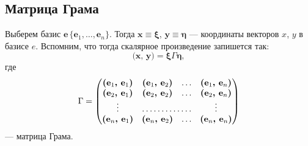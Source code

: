 \subsection{Матрица Грама}
Выберем базис $\textbf{e}\, \{\textbf{e$_1$},\dots,\textbf{e$_n$}\}$. Тогда $\textbf{x}\equiv \bm\xi$, $\textbf{y}\equiv \bm\eta$ --- координаты векторов $ x $, $ y $ в базисе $ e $. Вспомним, что тогда скалярное произведение запишется так:
$$
\textbf{(x, y)} = \bm\xi \Gamma \bm\eta,
$$
где 
$$
\Gamma = 
\begin{pmatrix}
\textbf{(e$_1$, e$_1$)} & \textbf{(e$_1$, e$_2$)} & \hdots & \textbf{(e$_1$, e$_n$)}\\
\textbf{(e$_2$, e$_1$)} & \textbf{(e$_2$, e$_2$)} & \hdots & \textbf{(e$_2$, e$_n$)}\\
\vdots & \hdotsfor{2} & \vdots\\
\textbf{(e$_n$, e$_1$)} & \textbf{(e$_n$, e$_2$)} & \hdots & \textbf{(e$_n$, e$_n$)}\\
\end{pmatrix}
$$
--- матрица Грама.